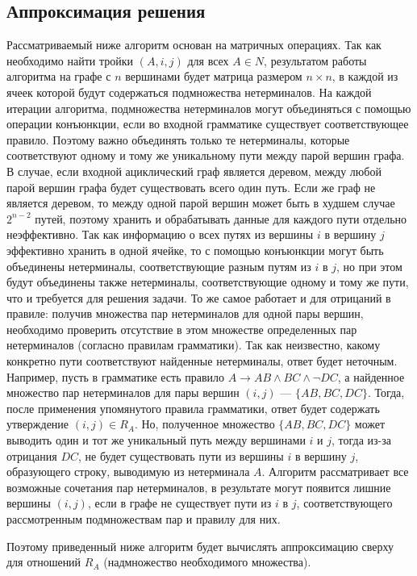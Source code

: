 \subsection{Аппроксимация решения}
Рассматриваемый ниже алгоритм основан на матричных операциях. Так как необходимо найти тройки $(A, i, j)$ для всех $A \in N$, результатом работы алгоритма  на графе с $n$ вершинами будет матрица размером $n \times n$, в каждой из ячеек которой будут содержаться подмножества нетерминалов. На каждой итерации алгоритма, подмножества нетерминалов могут объединяться с помощью операции конъюнкции, если во входной грамматике существует соответствующее правило. Поэтому важно объединять только те нетерминалы, которые соответствуют одному и тому же уникальному пути между парой вершин графа. В случае, если входной ациклический граф является деревом, между любой парой вершин графа будет существовать всего один путь. Если же граф не является деревом, то между одной парой вершин может быть в худшем случае $2^{n-2}$ путей, поэтому хранить и обрабатывать данные для каждого пути отдельно неэффективно. Так как информацию о всех путях из вершины $i$ в вершину $j$ эффективно хранить в одной ячейке, то с помощью конъюнкции могут быть объединены нетерминалы, соответствующие разным путям из $i$ в $j$, но при этом будут объединены также нетерминалы, соответствующие одному и тому же пути, что и требуется для решения задачи. То же самое работает и для отрицаний в правиле: получив множества пар нетерминалов для одной пары вершин, необходимо проверить отсутствие в этом множестве определенных пар нетерминалов (согласно правилам грамматики). Так как неизвестно, какому конкретно пути соответствуют найденные нетерминалы, ответ будет неточным.  Например, пусть в грамматике есть правило $A \to AB \wedge BC \wedge \neg DC$, а найденное множество пар нетерминалов для пары вершин $(i, j)$ --- $\{ AB, BC, DC\}$. Тогда, после применения упомянутого правила грамматики, ответ будет содержать утверждение $(i, j) \in R_A$. Но, полученное множество $\{ AB, BC, DC\}$ может выводить один и тот же уникальный путь между вершинами $i$ и $j$, тогда из-за отрицания $DC$, не будет существовать пути из вершины $i$ в вершину $j$, образующего строку, выводимую из нетерминала $A$.  Алгоритм рассматривает все возможные сочетания пар нетерминалов, в результате могут появится лишние вершины $(i,j)$, если в графе не существует пути из $i$ в $j$, соответствующего рассмотренным подмножествам пар и правилу для них.

Поэтому приведенный ниже алгоритм будет вычислять аппроксимацию сверху для отношений $R_A$ (надмножество необходимого множества).
